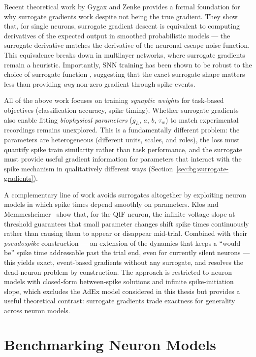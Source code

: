 Recent theoretical work by Gygax and Zenke \cite{Gygax2025} provides a formal foundation for why surrogate gradients work despite not being the true gradient.
They show that, for single neurons, surrogate gradient descent is equivalent to computing derivatives of the expected output in smoothed probabilistic models --- the surrogate derivative matches the derivative of the neuronal escape noise function.
This equivalence breaks down in multilayer networks, where surrogate gradients remain a heuristic.
Importantly, \gls{SNN} training has been shown to be robust to the choice of surrogate function \cite{Gygax2025}, suggesting that the exact surrogate shape matters less than providing \emph{any} non-zero gradient through spike events.

All of the above work focuses on training \emph{synaptic weights} for task-based objectives (classification accuracy, spike timing).
Whether surrogate gradients also enable fitting \emph{biophysical parameters} ($g_L$, $a$, $b$, $\tau_w$) to match experimental recordings remains unexplored.
This is a fundamentally different problem: the parameters are heterogeneous (different units, scales, and roles), the loss must quantify spike train similarity rather than task performance, and the surrogate must provide useful gradient information for parameters that interact with the spike mechanism in qualitatively different ways (Section~\ref{sec:bg:surrogate-gradients}).

A complementary line of work avoids surrogates altogether by exploiting neuron models in which spike times depend smoothly on parameters.
Klos and Memmesheimer~\cite{Klos2025} show that, for the \gls{QIF} neuron, the infinite voltage slope at threshold guarantees that small parameter changes shift spike times continuously rather than causing them to appear or disappear mid-trial.
Combined with their \emph{pseudospike} construction --- an extension of the dynamics that keeps a ``would-be'' spike time addressable past the trial end, even for currently silent neurons --- this yields exact, event-based gradients without any surrogate, and resolves the dead-neuron problem by construction.
The approach is restricted to neuron models with closed-form between-spike solutions and infinite spike-initiation slope, which excludes the \gls{AdEx} model considered in this thesis but provides a useful theoretical contrast: surrogate gradients trade exactness for generality across neuron models.

\section{Benchmarking Neuron Models}\label{sec:rw:benchmarking}

